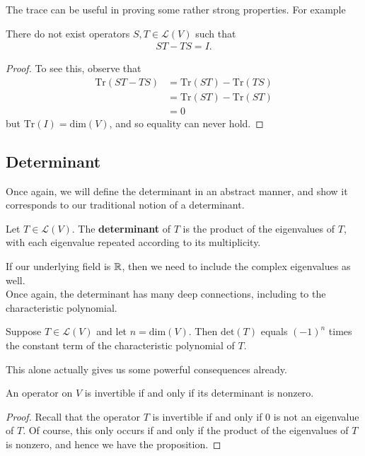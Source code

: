 \documentclass{memoir}
\begin{document}
The trace can be useful in proving some rather strong properties. For example
\begin{prop}
	There do not exist operators \(S,T \in \mathcal{L}(V)\) such that
	\begin{align*}
		ST-TS = I.
	\end{align*}
\end{prop}
\begin{proof}
	To see this, observe that
	\begin{align*}
		\textrm{Tr}(ST-TS) &= \textrm{Tr}(ST) - \textrm{Tr}(TS)\\
				   &= \textrm{Tr}(ST) - \textrm{Tr}(ST)\\
				   &= 0
	\end{align*}
	but \(\textrm{Tr}(I) = \textrm{dim}(V)\), and so equality can never hold. 
\end{proof}

\subsection{Determinant}
\label{subsec:determinant}

Once again, we will define the determinant in an abstract manner, and show it corresponds to our traditional notion of a determinant.

\begin{defn}[Determinant]
	Let \(T \in \mathcal{L}(V)\). The \textbf{determinant} of \(T\) is the product of the eigenvalues of \(T\), with each eigenvalue repeated according to its multiplicity.
\end{defn}
If our underlying field is \(\mathbb{R}\), then we need to include the complex eigenvalues as well.\\

Once again, the determinant has many deep connections, including to the characteristic polynomial.
\begin{prop}
	Suppose \(T \in \mathcal{L}(V)\) and let \(n = \textrm{dim}(V)\). Then \(\textrm{det}(T)\) equals \((-1)^{n}\) times the constant term of the characteristic polynomial of \(T\).
\end{prop}

This alone actually gives us some powerful consequences already.
\begin{prop}
	An operator on \(V\) is invertible if and only if its determinant is nonzero.
\end{prop}
\begin{proof}
	Recall that the operator \(T\) is invertible if and only if 0 is not an eigenvalue of \(T\). Of course, this only occurs if and only if the product of the eigenvalues of \(T\) is nonzero, and hence we have the proposition.
\end{proof}
\end{document}

